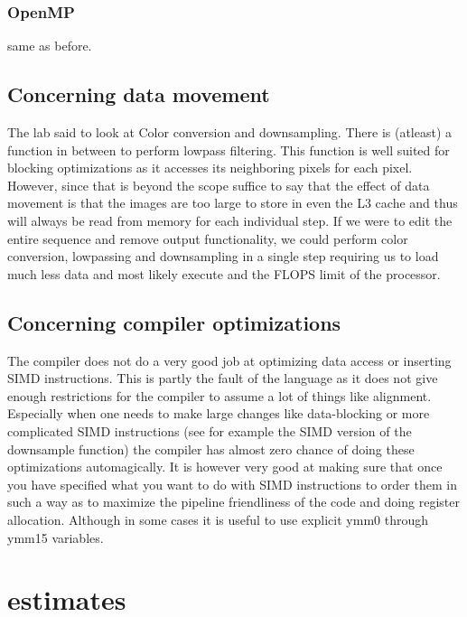 \documentclass{article}
\begin{document}
\subsubsection{OpenMP}
same as before.

\subsection{Concerning data movement}
The lab said to look at Color conversion and downsampling. There is (atleast) a function in between to perform lowpass filtering. This function is well suited for blocking optimizations as it accesses its neighboring pixels for each pixel.
However, since that is beyond the scope suffice to say that the effect of data movement is that the images are too large to store in even the L3 cache and thus will always be read from memory for each individual step.
If we were to edit the entire sequence and remove output functionality, we could perform color conversion, lowpassing and downsampling in a single step requiring us to load much less data and most likely execute and the FLOPS limit of the processor.

\subsection{Concerning compiler optimizations }
 The compiler does not do a very good job at optimizing data access or inserting SIMD instructions. This is partly the fault of the language as it does not give enough restrictions for the compiler to
 assume a lot of things like alignment. Especially when one needs to make large changes like data-blocking or more complicated SIMD instructions (see for example the SIMD version of the downsample function)
 the compiler has almost zero chance of doing these optimizations automagically. It is however very good at making sure that once you have specified what you want to do with SIMD instructions to order them in such a way as to maximize
 the pipeline friendliness of the code and doing register allocation. Although in some cases it is useful to use explicit ymm0 through ymm15 variables.

\section{estimates}
\end{document}
